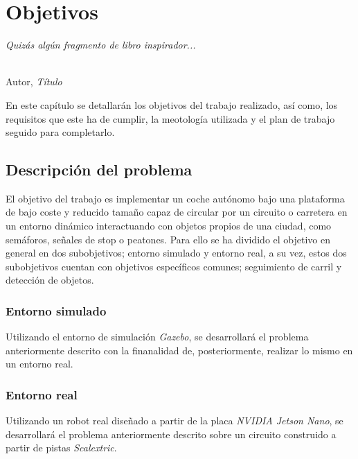 \chapter{Objetivos}
\label{cap:capitulo2}

\begin{flushright}
	\begin{minipage}[]{10cm}
		\emph{Quizás algún fragmento de libro inspirador...}\\
	\end{minipage}\\

	Autor, \textit{Título}\\
\end{flushright}

\vspace{1cm}

En este capítulo se detallarán los objetivos del trabajo realizado, así como, los requisitos que este ha de cumplir, la meotología utilizada y el plan de trabajo seguido para completarlo.\\

\section{Descripción del problema}
\label{sec:descripcion}

El objetivo del trabajo es implementar un coche autónomo bajo una plataforma de bajo coste y reducido tamaño capaz de circular por un circuito o carretera en un entorno dinámico interactuando con objetos propios de una ciudad, como semáforos, señales de stop o peatones. Para ello se ha dividido el objetivo en general en dos subobjetivos; entorno simulado y entorno real, a su vez, estos dos subobjetivos cuentan con objetivos específicos comunes; seguimiento de carril y detección de objetos.\\

\subsection{Entorno simulado}
Utilizando el entorno de simulación \textit{Gazebo}, se desarrollará el problema anteriormente descrito con la finanalidad de, posteriormente, realizar lo mismo en un entorno real.\\

\subsection{Entorno real}
Utilizando un robot real diseñado a partir de la placa \textit{NVIDIA Jetson Nano}, se desarrollará el problema anteriormente descrito sobre un circuito construido a partir de pistas \textit{Scalextric}.\\

